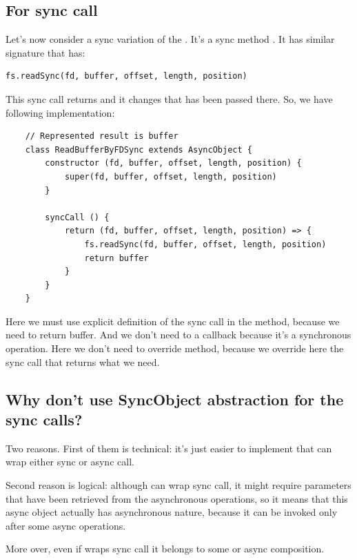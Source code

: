 \documentclass{article}
\begin{document}
\subsection{For sync call}

Let's now consider a sync variation of the . It's a sync method . It has similar signature that  has: 

\begin{verbatim}
fs.readSync(fd, buffer, offset, length, position)
\end{verbatim}

This sync call returns  and it changes  that has been passed there. So, we have following implementation:

\begin{verbatim}
    // Represented result is buffer
    class ReadBufferByFDSync extends AsyncObject {
        constructor (fd, buffer, offset, length, position) {
            super(fd, buffer, offset, length, position)
        }

        syncCall () {
            return (fd, buffer, offset, length, position) => {
                fs.readSync(fd, buffer, offset, length, position)
                return buffer
            }
        }
    }
\end{verbatim}

Here we must use explicit definition of the sync call in the  method, because we need to return buffer. And we don't need to a callback because it's a synchronous operation. Here we don't need to override  method, because we override here the sync call that returns what we need.

\subsection{Why don't use SyncObject abstraction for the sync calls?}

Two reasons. First of them is technical: it's just easier to implement  that can wrap either sync or async call. 

Second reason is logical: although  can wrap sync call, it might require parameters that have been retrieved from the asynchronous operations, so it means that this async object actually has asynchronous nature, because it can be invoked only after some async operations.

More over, even if  wraps sync call it belongs to some  or async composition.
\end{document}
